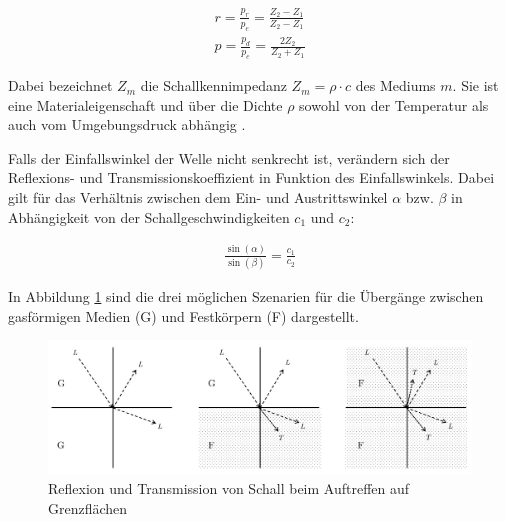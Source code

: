\begin{equation}
\begin{gathered}
r=\frac{p_{r}}{p_{e}}=\frac{Z_{2}-Z_{1}}{Z_{2}-Z_{1}}\\
p=\frac{p_d}{p_e}=\frac{2 Z_{2}}{Z_{2}+Z_{1}}
\end{gathered}\label{eq:reflexion}
\end{equation}

Dabei bezeichnet $Z_{m}$ die Schallkennimpedanz $Z_{m}=\rho \cdot c$ des Mediums $m$. Sie ist eine Material\-eigenschaft und über die Dichte $\rho$ sowohl von der Temperatur als auch vom Umgebungsdruck abhängig \cite{HERING}.

Falls der Einfallswinkel der Welle nicht senkrecht ist, verändern sich der Reflexions- und Transmissionskoeffizient in Funktion des Einfallswinkels. Dabei gilt für das Verhältnis zwischen dem Ein- und Austrittswinkel $\alpha$ bzw. $\beta$ in Abhängigkeit von der Schallgeschwindigkeiten $c_{1}$ und $c_{2}$:

\begin{equation}
\begin{gathered}
\frac{\sin(\alpha)}{\sin(\beta)}=\frac{c_{1}}{c_{2}}
\end{gathered}\label{eq:reflexion_winkel}
\end{equation}

In Abbildung \ref{fig:image_grundlagen_transmission_absorbtion} sind  die drei möglichen Szenarien für die Übergänge zwischen gasförmigen Medien (G) und Festkörpern (F) dargestellt.

\begin{figure}[htb]
\begin{center}
\includegraphics[width=\textwidth]{graphics/image_grundlagen_transmission_absorbtion.png}
\end{center}
\caption{Reflexion und Transmission von Schall beim Auftreffen auf Grenzflächen \cite{KOHLRAUSCH}} %
\label{fig:image_grundlagen_transmission_absorbtion}
\end{figure}
%

